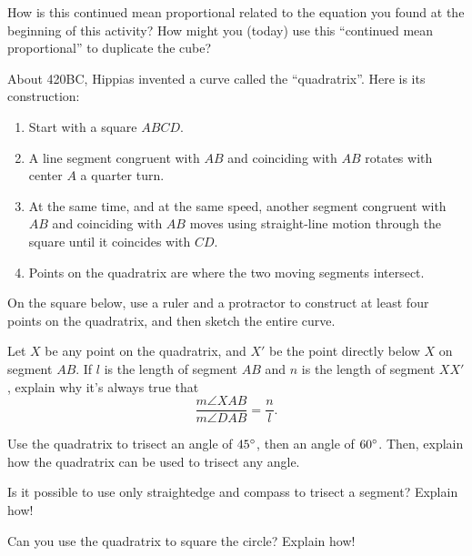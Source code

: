 \documentclass[handout]{ximera}
\begin{document}
\begin{question}
How is this continued mean proportional related to the equation you found at the beginning of this activity?  How might you (today) use this ``continued mean proportional'' to duplicate the cube?
\end{question}

\newpage

About 420BC, Hippias invented a curve called the ``quadratrix''.  Here is its construction:
\begin{enumerate}
    \item Start with a square $ABCD$.
    \item A line segment congruent with $AB$ and coinciding with $AB$ rotates with center $A$ a quarter turn.
    \item At the same time, and at the same speed, another segment congruent with $AB$ and coinciding with $AB$ moves using straight-line motion through the square until it coincides with $CD$.
    \item Points on the quadratrix are where the two moving segments intersect.
\end{enumerate}



\begin{question}
On the square below, use a ruler and a protractor to construct at least four points on the quadratrix, and then sketch the entire curve.
\begin{image}
\end{image}
\end{question}

\begin{question}
Let $X$ be any point on the quadratrix, and $X'$ be the point directly below $X$ on segment $AB$.  If $l$ is the length of segment $AB$ and $n$ is the length of segment $XX'$, explain why it's always true that 
\[
\frac{m\angle XAB}{m\angle DAB} = \frac{n}{l}.
\]
\end{question}

\begin{question}
Use the quadratrix to trisect an angle of $45\degree$, then an angle of $60\degree$.  Then, explain how the quadratrix can be used to trisect any angle.
\end{question}

\begin{question}
Is it possible to use only straightedge and compass to trisect a segment?  Explain how!
\end{question}



\begin{question}
Can you use the quadratrix to square the circle?  Explain how!
\end{question}
\end{document}
